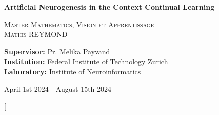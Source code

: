 \documentclass[11pt]{article}
\begin{document}
\begin{titlepage}
    
    
    \vspace{0cm}
    
    
    \vfill
    
    {\huge \bfseries Artificial Neurogenesis in the Context Continual Learning \\[0.4cm]} %
    
    \textsc{\LARGE Master Mathematics, Vision et Apprentissage}\\[1.5cm] %
    
    \textsc{\Large Mathis REYMOND}\\[0.5cm] %
    
    \vfill
    
    \Large
    \begin{tabbing}
        \hspace{4cm} \= \textbf{Supervisor:} \hspace{1cm} \= Pr. Melika Payvand \\ %
        \hspace{4cm} \= \textbf{Institution:} \> Federal Institute of Technology Zurich \\ %
        \hspace{4cm} \= \textbf{Laboratory:} \> Institute of Neuroinformatics \\ %
    \end{tabbing}
    
    \vfill
    
    {\large April 1st 2024 - August 15th 2024}\\[2cm] %
    
\end{titlepage}



\twocolumn[
\end{document}
